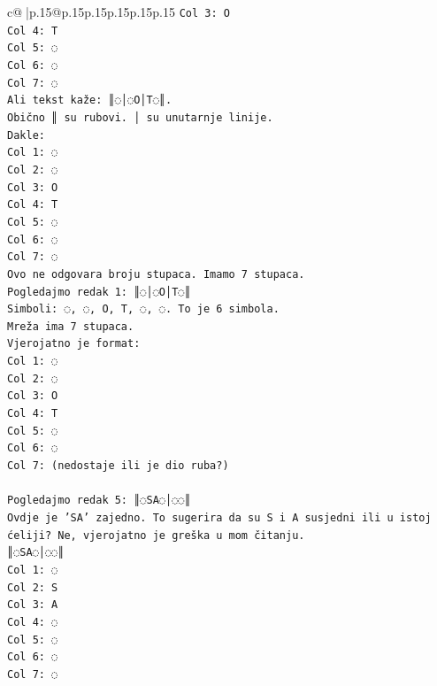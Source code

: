 \documentclass{article}
\begin{document}
{\begin{supertabular}{c@{$\;$}|p{.15\linewidth}@{}p{.15\linewidth}p{.15\linewidth}p{.15\linewidth}p{.15\linewidth}p{.15\linewidth}}
{{{\texttt{Col 3: O} \\
\texttt{Col 4: T} \\
\texttt{Col 5: ◌} \\
\texttt{Col 6: ◌} \\
\texttt{Col 7: ◌} \\
\texttt{Ali tekst kaže: ║◌│◌O│T◌║.} \\
\texttt{Obično ║ su rubovi. │ su unutarnje linije.} \\
\texttt{Dakle:} \\
\texttt{Col 1: ◌} \\
\texttt{Col 2: ◌} \\
\texttt{Col 3: O} \\
\texttt{Col 4: T} \\
\texttt{Col 5: ◌} \\
\texttt{Col 6: ◌} \\
\texttt{Col 7: ◌} \\
\texttt{Ovo ne odgovara broju stupaca. Imamo 7 stupaca.} \\
\texttt{Pogledajmo redak 1: ║◌│◌O│T◌║} \\
\texttt{Simboli: ◌, ◌, O, T, ◌, ◌. To je 6 simbola.} \\
\texttt{Mreža ima 7 stupaca.} \\
\texttt{Vjerojatno je format:} \\
\texttt{Col 1: ◌} \\
\texttt{Col 2: ◌} \\
\texttt{Col 3: O} \\
\texttt{Col 4: T} \\
\texttt{Col 5: ◌} \\
\texttt{Col 6: ◌} \\
\texttt{Col 7: (nedostaje ili je dio ruba?)} \\
\\ 
\texttt{Pogledajmo redak 5: ║◌SA◌│◌◌║} \\
\texttt{Ovdje je 'SA' zajedno. To sugerira da su S i A susjedni ili u istoj ćeliji? Ne, vjerojatno je greška u mom čitanju.} \\
\texttt{║◌SA◌│◌◌║} \\
\texttt{Col 1: ◌} \\
\texttt{Col 2: S} \\
\texttt{Col 3: A} \\
\texttt{Col 4: ◌} \\
\texttt{Col 5: ◌} \\
\texttt{Col 6: ◌} \\
\texttt{Col 7: ◌} \\
}}}
\end{supertabular}}
\end{document}
